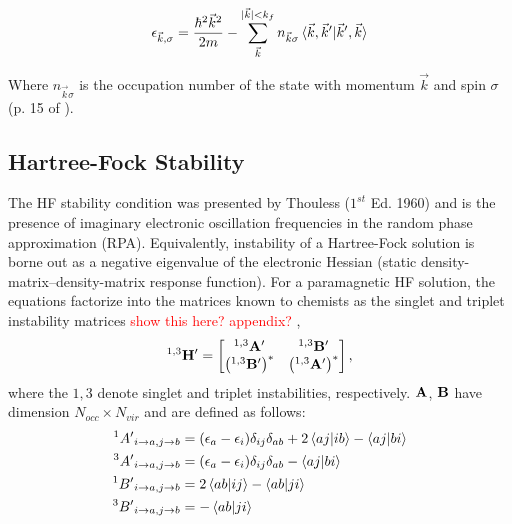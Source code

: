 \documentclass{revtex4}
\begin{document}
    \begin{equation}\label{eq:hf_orb_energy}
    \epsilon_{\vec{k},\sigma}=
    \frac{\hbar^2\vec{k}^2}{2m} - \sum\limits_{\vec{k}}^{|\vec{k}|< k_f}n_{\vec{k}\sigma}\braket{\vec{k}, \vec{k}' |\vec{k}', \vec{k}}
    \end{equation}
    
    Where $n_{\vec{k}\sigma}$ is the occupation number of the state with momentum $\vec{k}$ and spin $\sigma$ (p. 15 of \cite{Guiliani2005}). 

    \subsection{Hartree-Fock Stability}
    The HF stability condition was presented by Thouless \cite{Thouless1972} ($1^{st}$ Ed. 1960) and is the presence of imaginary electronic oscillation frequencies in the random phase approximation (RPA). Equivalently, instability of a Hartree-Fock solution is borne out as a negative eigenvalue of the electronic Hessian (static density-matrix--density-matrix response function). For a paramagnetic HF solution, the equations factorize into the matrices known to chemists as the singlet and triplet instability matrices \cite{Dunning1967}\cite{Seeger1977} \textcolor{red}{show this here? appendix?}
    ,
    \begin{equation}\label{eq:1,3H}
    {}^{1,3}\bf{H'}=
    \begin{bmatrix}
    {}^{1,3}\bf{A'} & {}^{1,3}\bf{B'} \\
    \left({}^{1,3}\bf{B'}\right)^* & \left({}^{1,3}\bf{A'}\right)^* \\
    \end{bmatrix},
    \end{equation}
    where the $1,3$ denote singlet and triplet instabilities, respectively. $\bf{A}$, $\bf{B}$ have dimension $N_{occ}\times N_{vir}$ and are defined as follows:
    \begin{subequations}
    	\begin{align}
    	{}^{1}{A'}_{i\rightarrow a, j\rightarrow b} &= (\epsilon_a-\epsilon_i)\delta_{ij}\delta_{ab} + 2\braket{aj|ib}-\braket{aj|bi}\\
    	{}^{3}{A'}_{i\rightarrow a, j\rightarrow b} &= (\epsilon_a-\epsilon_i)\delta_{ij}\delta_{ab} - \braket{aj|bi}\\
    	{}^{1}{B'}_{i\rightarrow a, j\rightarrow b} &= 2\braket{ab|ij}-\braket{ab|ji}\\
    	{}^{3}{B'}_{i\rightarrow a, j\rightarrow b} &= -\braket{ab|ji}
    	\end{align}
    \end{subequations}
\end{document}

